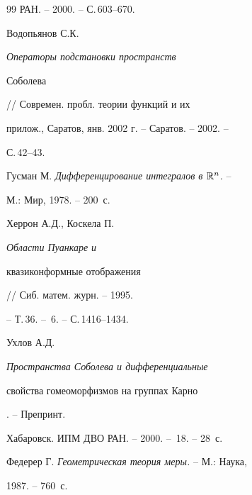 \begin{thebibliography}{99}
РАН. -- 2000. -- С.\,603--670.







Водопьянов С.К. {\it Операторы подстановки пространств


Соболева} // Современ. пробл. теории функций и их


прилож., Саратов, янв. 2002 г. -- Саратов. -- 2002. --


С.\,42--43.







Гусман М. {\it Дифференцирование интегралов в ${\Bbb R}^n$.} --


М.: Мир, 1978. -- 200~с.







Херрон А.Д., Коскела П. {\it Области Пуанкаре и


квазиконформные отображения} // Сиб. матем. журн. -- 1995.


-- Т.\,36. -- \No\,6. -- С.\,1416--1434.







Ухлов А.Д. {\it Пространства Соболева и дифференциальные


свойства гомеоморфизмов на группах Карно}. -- Препринт.


Хабаровск. ИПМ ДВО РАН. -- 2000. -- \No\,18. -- 28~с.







Федерер Г. {\it Геометрическая теория меры.} -- М.: Наука,


1987. -- 760~с.





\end{thebibliography}





\vskip 2cm












\label{end}


